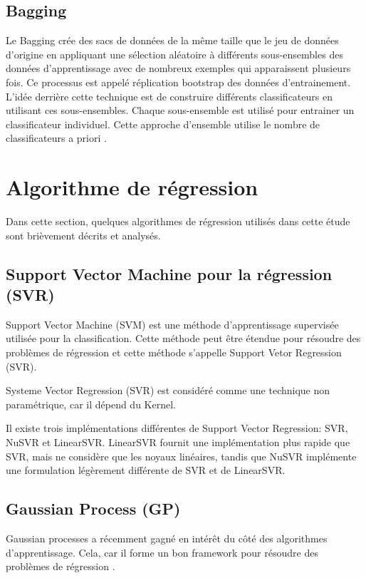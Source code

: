 \subsection{Bagging}
Le Bagging \cite{ML35} crée des sacs de données de la même taille que le jeu de données d'origine en appliquant une sélection aléatoire à différents sous-ensembles des données d'apprentissage avec de nombreux exemples qui apparaissent plusieurs fois. Ce processus est appelé réplication bootstrap des données d'entrainement. L'idée derrière cette technique est de construire différents classificateurs en utilisant ces sous-ensembles. Chaque sous-ensemble est utilisé pour entrainer un classificateur individuel. Cette approche d'ensemble utilise le nombre de classificateurs a priori \cite{ML35}.

\section{Algorithme de régression}
Dans cette section, quelques algorithmes de régression utilisés dans cette étude \cite{ML_UWB} sont brièvement décrits et analysés.

\subsection{Support Vector Machine pour la régression (SVR)}
Support Vector Machine (SVM) est une méthode d'apprentissage supervisée utilisée pour la classification. Cette méthode peut être étendue pour résoudre des problèmes de régression et cette méthode s'appelle Support Vetor Regression (SVR).

Systeme Vector Regression (SVR) est considéré comme une technique non paramétrique, car il dépend du Kernel. 

Il existe trois implémentations différentes de Support Vector Regression: SVR, NuSVR et LinearSVR. LinearSVR fournit une implémentation plus rapide que SVR, mais ne considère que les noyaux linéaires, tandis que NuSVR implémente une formulation légèrement différente de SVR et de LinearSVR.\cite{scikit}

\subsection{Gaussian Process (GP)}
Gaussian processes a récemment gagné en intérêt du côté des algorithmes d'apprentissage. Cela, car il forme un bon framework pour résoudre des problèmes de régression \cite{ML51}.

